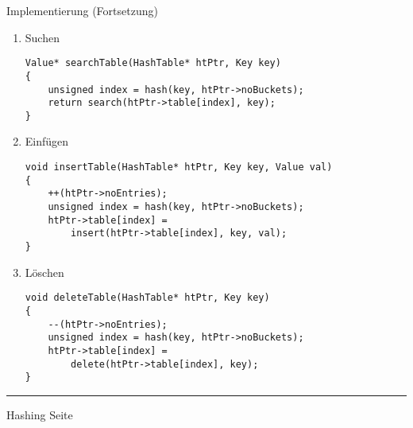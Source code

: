 
\begin{slide}{}
\normalsize

\begin{center}
Implementierung (Fortsetzung)
\end{center}
\vspace*{0.5cm}

\footnotesize
\begin{enumerate}
\item Suchen
      \begin{verbatim}
Value* searchTable(HashTable* htPtr, Key key) 
{
    unsigned index = hash(key, htPtr->noBuckets);
    return search(htPtr->table[index], key);
}
      \end{verbatim}
\item Einf\"ugen
\begin{verbatim}
void insertTable(HashTable* htPtr, Key key, Value val)
{
    ++(htPtr->noEntries);
    unsigned index = hash(key, htPtr->noBuckets);
    htPtr->table[index] = 
        insert(htPtr->table[index], key, val);
}
\end{verbatim}
\item L\"oschen
\begin{verbatim}
void deleteTable(HashTable* htPtr, Key key) 
{
    --(htPtr->noEntries);
    unsigned index = hash(key, htPtr->noBuckets);
    htPtr->table[index] = 
        delete(htPtr->table[index], key);
}
\end{verbatim}
\end{enumerate}

\vspace*{\fill}
\tiny \addtocounter{mypage}{1}
\rule{17cm}{1mm}
Hashing  \hspace*{\fill} Seite 
\end{slide}


